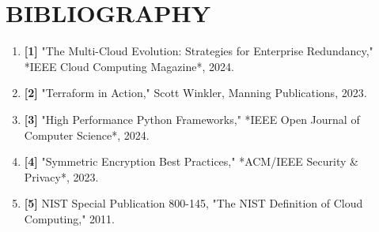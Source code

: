 \newpage
\chapter*{BIBLIOGRAPHY}

\begin{enumerate}
    \item \textbf{[1]} "The Multi-Cloud Evolution: Strategies for Enterprise Redundancy," *IEEE Cloud Computing Magazine*, 2024.
    \item \textbf{[2]} "Terraform in Action," Scott Winkler, Manning Publications, 2023.
    \item \textbf{[3]} "High Performance Python Frameworks," *IEEE Open Journal of Computer Science*, 2024.
    \item \textbf{[4]} "Symmetric Encryption Best Practices," *ACM/IEEE Security & Privacy*, 2023.
    \item \textbf{[5]} NIST Special Publication 800-145, "The NIST Definition of Cloud Computing," 2011.
\end{enumerate}
